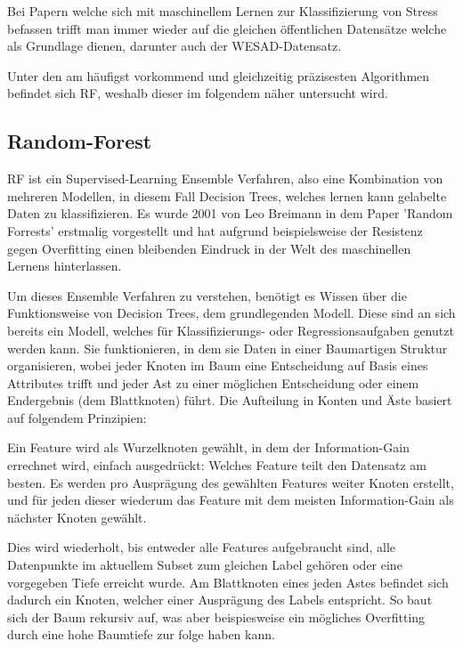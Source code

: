 Bei Papern welche sich mit maschinellem Lernen zur Klassifizierung von Stress befassen trifft man immer wieder auf die gleichen öffentlichen Datensätze welche als Grundlage dienen, darunter auch der WESAD-Datensatz.

Unter den am häufigst vorkommend und gleichzeitig präzisesten Algorithmen befindet sich \ac{RF}, weshalb dieser im folgendem näher untersucht wird. \cite{VOS2023105026}

\subsection{Random-Forest}

\ac{RF} ist ein Supervised-Learning Ensemble Verfahren, also eine Kombination von mehreren Modellen, in diesem Fall Decision Trees, welches lernen kann gelabelte Daten
zu klassifizieren. Es wurde 2001 von Leo Breimann in dem Paper 'Random Forrests' erstmalig vorgestellt und hat aufgrund beispielsweise der Resistenz gegen
Overfitting einen bleibenden Eindruck in der Welt des maschinellen Lernens hinterlassen.

Um dieses Ensemble Verfahren zu verstehen, benötigt es Wissen über die Funktionsweise von Decision Trees, dem grundlegenden Modell. 
Diese sind an sich bereits ein Modell, welches für Klassifizierungs- oder Regressionsaufgaben genutzt werden kann. Sie funktionieren, in dem sie
Daten in einer Baumartigen Struktur organisieren, wobei jeder Knoten im Baum eine Entscheidung auf Basis eines Attributes trifft und jeder Ast zu einer möglichen 
Entscheidung oder einem Endergebnis (dem Blattknoten) führt. Die Aufteilung in Konten und Äste basiert auf folgendem Prinzipien:

Ein Feature wird als Wurzelknoten gewählt, in dem der Information-Gain errechnet wird, einfach ausgedrückt: Welches Feature teilt den Datensatz am besten.
Es werden pro Ausprägung des gewählten Features weiter Knoten erstellt, und für jeden dieser wiederum das Feature mit dem meisten Information-Gain als nächster Knoten gewählt.

Dies wird wiederholt, bis entweder alle Features aufgebraucht sind, alle Datenpunkte im aktuellem Subset zum gleichen Label gehören oder eine vorgegeben Tiefe erreicht wurde.
Am Blattknoten eines jeden Astes befindet sich dadurch ein Knoten, welcher einer Ausprägung des Labels entspricht. So baut sich der Baum rekursiv auf, was aber beispiesweise ein mögliches Overfitting
durch eine hohe Baumtiefe zur folge haben kann.

